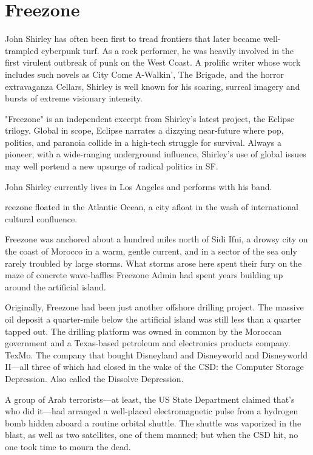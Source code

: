 \chapter{Freezone}

John Shirley has often been first to tread frontiers that later became well-trampled cyberpunk turf. As a rock performer, he was heavily involved in the first virulent outbreak of punk on the West Coast. A prolific writer whose work includes such novels as City Come A-Walkin', The Brigade, and the horror extravaganza Cellars, Shirley is well known for his soaring, surreal imagery and bursts of extreme visionary intensity.

"Freezone" is an independent excerpt from Shirley's latest project, the Eclipse trilogy. Global in scope, Eclipse narrates a dizzying near-future where pop, politics, and paranoia collide in a high-tech struggle for survival. Always a pioneer, with a wide-ranging underground influence, Shirley's use of global issues may well portend a new upsurge of radical politics in SF.

John Shirley currently lives in Los Angeles and performs with his band.

\hrulefill

reezone floated in the Atlantic Ocean, a city afloat in the wash of international cultural confluence.

Freezone was anchored about a hundred miles north of Sidi Ifni, a drowsy city on the coast of Morocco in a warm, gentle current, and in a sector of the sea only rarely troubled by large storms. What storms arose here spent their fury on the maze of concrete wave-baffles Freezone Admin had spent years building up around the artificial island.

Originally, Freezone had been just another offshore drilling project. The massive oil deposit a quarter-mile below the artificial island was still less than a quarter tapped out. The drilling platform was owned in common by the Moroccan government and a Texas-based petroleum and electronics products company. TexMo. The company that bought Disneyland and Disneyworld and Disneyworld II—all three of which had closed in the wake of the CSD: the Computer Storage Depression. Also called the Dissolve Depression.

A group of Arab terrorists—at least, the US State Department claimed that’s who did it—had arranged a well-placed electromagnetic pulse from a hydrogen bomb hidden aboard a routine orbital shuttle. The shuttle was vaporized in the blast, as well as two satellites, one of them manned; but when the CSD hit, no one took time to mourn the dead.

